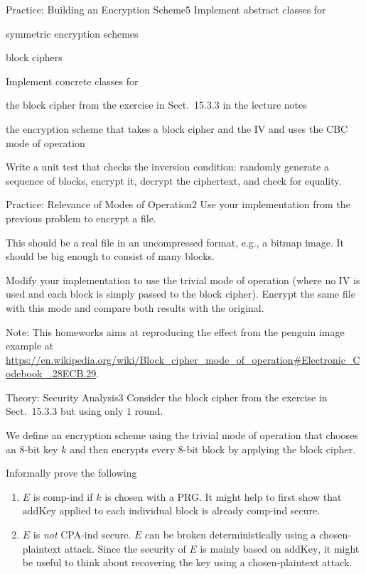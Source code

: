 \documentclass[a4paper]{article}
\begin{document}
\header

\begin{problem}{Practice: Building an Encryption Scheme}{5}
Implement abstract classes for
\begin{compactitem}
 \item symmetric encryption schemes
 \item block ciphers
\end{compactitem}

Implement concrete classes for
\begin{compactitem}
 \item the block cipher from the exercise in Sect.~15.3.3 in the lecture notes
 \item the encryption scheme that takes a block cipher and the IV and uses the CBC mode of operation
\end{compactitem} 

Write a unit test that checks the inversion condition: randomly generate a sequence of blocks, encrypt it, decrypt the ciphertext, and check for equality.
\end{problem}

\begin{problem}{Practice: Relevance of Modes of Operation}{2}
Use your implementation from the previous problem to encrypt a file.

This should be a real file in an uncompressed format, e.g., a bitmap image.
It should be big enough to consist of many blocks.

Modify your implementation to use the trivial mode of operation (where no IV is used and each block is simply passed to the block cipher).
Encrypt the same file with this mode and compare both results with the original.

Note: This homeworks aims at reproducing the effect from the penguin image example at \url{https://en.wikipedia.org/wiki/Block_cipher_mode_of_operation#Electronic_Codebook_.28ECB.29}.
\end{problem}

\begin{problem}{Theory: Security Analysis}{3}
Consider the block cipher from the exercise in Sect.~15.3.3 but using only $1$ round.

We define an encryption scheme using the trivial mode of operation that chooses an $8$-bit key $k$ and then encrypts every $8$-bit block by applying the block cipher.

Informally prove the following
\begin{enumerate}
  \item $E$ is comp-ind if $k$ is chosen with a PRG.
  It might help to first show that $\mathrm{addKey}$ applied to each individual block is already comp-ind secure.
  \item $E$ is \emph{not} CPA-ind secure.
  $E$ can be broken deterministically using a chosen-plaintext attack.
  Since the security of $E$ is mainly based on $\mathrm{addKey}$, it might be useful to think about recovering the key using a chosen-plaintext attack. 
\end{enumerate}
\end{problem}
\end{document}

